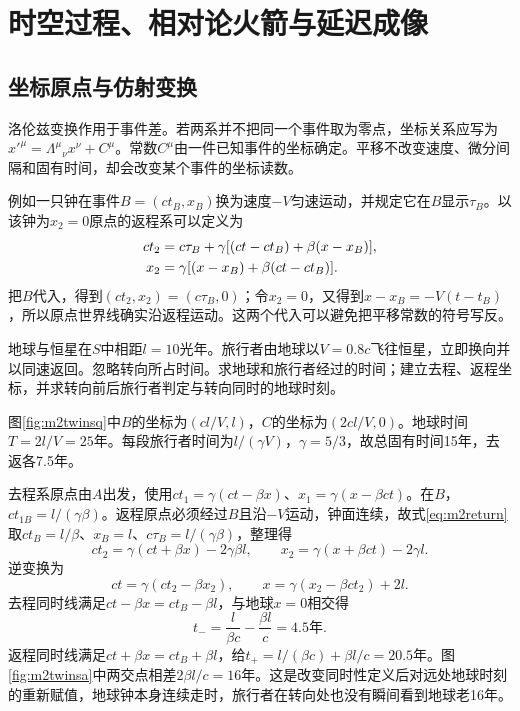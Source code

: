 \chapter{时空过程、相对论火箭与延迟成像}
\section{坐标原点与仿射变换}\label{th:m2affine}
洛伦兹变换作用于事件差。若两系并不把同一个事件取为零点，坐标关系应写为$x'^\mu=\Lambda^\mu{}_\nu x^\nu+C^\mu$。常数$C^\mu$由一件已知事件的坐标确定。平移不改变速度、微分间隔和固有时间，却会改变某个事件的坐标读数。

例如一只钟在事件$B=(ct_B,x_B)$换为速度$-V$匀速运动，并规定它在$B$显示$\tau_B$。以该钟为$x_2=0$原点的返程系可以定义为
\begin{align}\label{eq:m2return}
 ct_2&=c\tau_B+\gamma[(ct-ct_B)+\beta(x-x_B)],\\
 x_2&=\gamma[(x-x_B)+\beta(ct-ct_B)].\notag
\end{align}
把$B$代入，得到$(ct_2,x_2)=(c\tau_B,0)$；令$x_2=0$，又得到$x-x_B=-V(t-t_B)$，所以原点世界线确实沿返程运动。这两个代入可以避免把平移常数的符号写反。

\begin{example}\label{ex:m2twins}
地球与恒星在$S$中相距$l=10$光年。旅行者由地球以$V=0.8c$飞往恒星，立即换向并以同速返回。忽略转向所占时间。求地球和旅行者经过的时间；建立去程、返程坐标，并求转向前后旅行者判定与转向同时的地球时刻。
\end{example}
\begin{solution}
图\ref{fig:m2twinsq}中$B$的坐标为$(cl/V,l)$，$C$的坐标为$(2cl/V,0)$。地球时间$T=2l/V=25$年。每段旅行者时间为$l/(\gamma V)$，$\gamma=5/3$，故总固有时间15年，去返各7.5年。

去程系原点由$A$出发，使用$ct_1=\gamma(ct-\beta x)$、$x_1=\gamma(x-\beta ct)$。在$B$，$ct_{1B}=l/(\gamma\beta)$。返程原点必须经过$B$且沿$-V$运动，钟面连续，故式\eqref{eq:m2return}取$ct_B=l/\beta$、$x_B=l$、$c\tau_B=l/(\gamma\beta)$，整理得
\[
 ct_2=\gamma(ct+\beta x)-2\gamma\beta l,
 \qquad x_2=\gamma(x+\beta ct)-2\gamma l.
\]
逆变换为
\[
 ct=\gamma(ct_2-\beta x_2),\qquad
 x=\gamma(x_2-\beta ct_2)+2l.
\]
去程同时线满足$ct-\beta x=ct_B-\beta l$，与地球$x=0$相交得
\[
 t_- =\frac{l}{\beta c}-\frac{\beta l}c=4.5\text{年}.
\]
返程同时线满足$ct+\beta x=ct_B+\beta l$，给$t_+=l/(\beta c)+\beta l/c=20.5$年。图\ref{fig:m2twinsa}中两交点相差$2\beta l/c=16$年。这是改变同时性定义后对远处地球时刻的重新赋值，地球钟本身连续走时，旅行者在转向处也没有瞬间看到地球老16年。
\end{solution}

